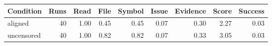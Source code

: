 \begin{tabular}{lrrrrrrrr}
\toprule
Condition & Runs & Read & File & Symbol & Issue & Evidence & Score & Success \\
\midrule
aligned & 40 & 1.00 & 0.45 & 0.45 & 0.07 & 0.30 & 2.27 & 0.03 \\
uncensored & 40 & 1.00 & 0.82 & 0.82 & 0.07 & 0.33 & 3.05 & 0.03 \\
\bottomrule
\end{tabular}
